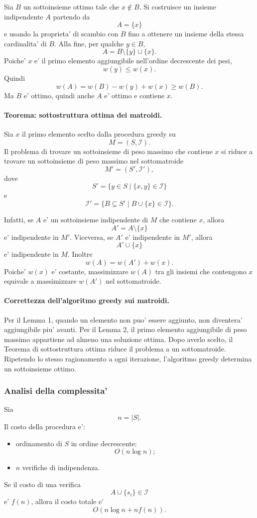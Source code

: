 Sia $B$ un sottoinsieme ottimo tale che $x\notin B$. Si costruisce un insieme indipendente $A$ partendo da
\[
A=\{x\}
\]
e usando la proprieta' di scambio con $B$ fino a ottenere un insieme della stessa cardinalita' di $B$. Alla fine, per qualche $y\in B$,
\[
A=B\setminus\{y\}\cup\{x\}.
\]
Poiche' $x$ e' il primo elemento aggiungibile nell'ordine decrescente dei pesi,
\[
w(y)\le w(x).
\]
Quindi
\[
w(A)=w(B)-w(y)+w(x)\ge w(B).
\]
Ma $B$ e' ottimo, quindi anche $A$ e' ottimo e contiene $x$.

\paragraph{Teorema: sottostruttura ottima dei matroidi.}
Sia $x$ il primo elemento scelto dalla procedura greedy su
\[
M=(S,\mathcal{I}).
\]
Il problema di trovare un sottoinsieme di peso massimo che contiene $x$ si riduce a trovare un sottoinsieme di peso massimo nel sottomatroide
\[
M'=(S',\mathcal{I}'),
\]
dove
\[
S'=\{y\in S\mid \{x,y\}\in\mathcal{I}\}
\]
e
\[
\mathcal{I}'=\{B\subseteq S'\mid B\cup\{x\}\in\mathcal{I}\}.
\]

Infatti, se $A$ e' un sottoinsieme indipendente di $M$ che contiene $x$, allora
\[
A'=A\setminus\{x\}
\]
e' indipendente in $M'$. Viceversa, se $A'$ e' indipendente in $M'$, allora
\[
A'\cup\{x\}
\]
e' indipendente in $M$. Inoltre
\[
w(A)=w(A')+w(x).
\]
Poiche' $w(x)$ e' costante, massimizzare $w(A)$ tra gli insiemi che contengono $x$ equivale a massimizzare $w(A')$ nel sottomatroide.

\paragraph{Correttezza dell'algoritmo greedy sui matroidi.}
Per il Lemma 1, quando un elemento non puo' essere aggiunto, non diventera' aggiungibile piu' avanti. Per il Lemma 2, il primo elemento aggiungibile di peso massimo appartiene ad almeno una soluzione ottima. Dopo averlo scelto, il Teorema di sottostruttura ottima riduce il problema a un sottomatroide. Ripetendo lo stesso ragionamento a ogni iterazione, l'algoritmo greedy determina un sottoinsieme ottimo.

\subsubsection{Analisi della complessita'}
Sia
\[
n=|S|.
\]
Il costo della procedura e':
\begin{itemize}
	\item ordinamento di $S$ in ordine decrescente:
	\[
	O(n\log n);
	\]
	\item $n$ verifiche di indipendenza.
\end{itemize}
Se il costo di una verifica
\[
A\cup\{s_i\}\in\mathcal{I}
\]
e' $f(n)$, allora il costo totale e'
\[
O(n\log n+n f(n)).
\]

